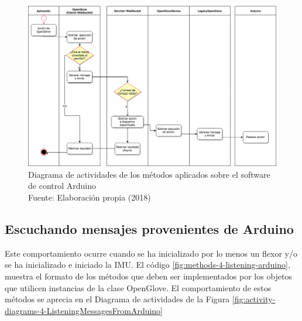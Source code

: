 \begin{figure}[H]
  \begin{center} 
   	\includegraphics[width=1.0\textwidth]{images/chapter04/ActivityDiagrams-OpenGloveActions-3.png} 
   \captionsetup{justification=centering}
    \caption[Diagrama de actividades de los métodos aplicados sobre el software de control Arduino]{Diagrama de actividades de los métodos aplicados sobre el software de control Arduino\\Fuente: Elaboración propia (2018)}
    \label{fig:activity-diagrams-3-openglove-arduino}
  \end{center}
\end{figure}


\subsection{Escuchando mensajes provenientes de Arduino}
\label{subsection:reading-openglove-arduino}
Este comportamiento ocurre cuando se ha inicializado por lo menos un flexor y/o se ha inicializado e iniciado la IMU. El código \ref{fig:methods-4-listening-arduino}, muestra el formato de los métodos que deben ser implementados por los objetos que utilicen instancias de la clase OpenGlove. El comportamiento de estos métodos se aprecia en el Diagrama de actividades de la Figura \ref{fig:activity-diagrams-4-ListeningMessagesFromArduino}

